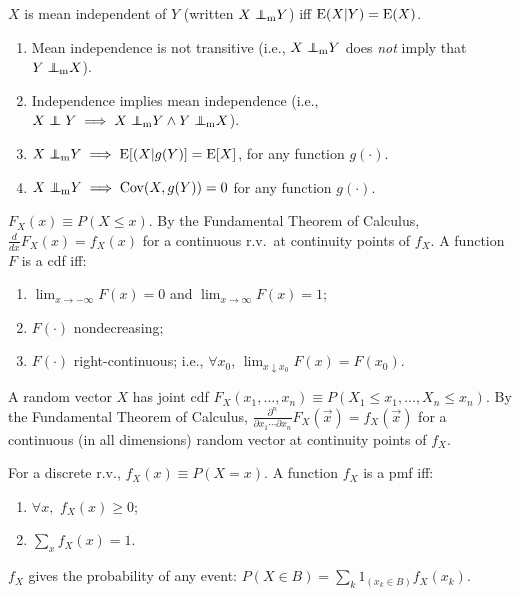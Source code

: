 \documentclass[8pt,letterpaper, landscape]{extarticle} %
\begin{document}
\begin{multicols}{3}
\begin{description}
 $ X $ is mean independent of $ Y $ (written $ X \independentm Y $) iff $ \operatorname{E} (X|Y) = \operatorname{E} (X) $.
\begin{enumerate}
\item Mean independence is not transitive (i.e., $ X \independentm Y $ does \textit{not} imply that $ Y \independentm X $).
\item Independence implies mean independence (i.e., $ X \independent Y \implies X \independentm Y \land Y \independentm X  $).
\item $ X \independentm Y \implies \E [(X | g(Y)] = \E [X] $, for any function $ g (\cdot) $.
\item $ X \independentm Y \implies \Cov (X, g(Y)) = 0 $ for any function $ g (\cdot) $.
\end{enumerate}

 $ F_X(x) \equiv P(X \leq x) $. By the Fundamental Theorem of Calculus, $ \frac{d}{dx} F_X(x) = f_X(x) $ for a continuous r.v.\ at continuity points of $ f_X $. A function $ F $ is a cdf iff:
\begin{enumerate}
\item $ \lim_{x \to -\infty} F(x) = 0 $ and $ \lim_{x \to \infty} F(x) = 1 $;
\item $ F (\cdot) $ nondecreasing;
\item $ F (\cdot) $ right-continuous; i.e., $ \forall x_0 $, $ \lim_{x \downarrow x_0} F(x) = F(x_0) $.
\end{enumerate}
A random vector $ X $ has joint cdf $ F_X(x_1, \dotsc, x_n) \equiv P (X_1 \leq x_1, \dotsc, X_n \leq x_n) $. By the Fundamental Theorem of Calculus, $ \frac{\partial^n}{\partial x_1 \dotsm \partial x_n} F_X(\vec{x}) = f_X(\vec{x}) $ for a continuous (in all dimensions) random vector at continuity points of $ f_X $.

 For a discrete r.v., $ f_X (x) \equiv P (X = x) $. A function $ f_X $ is a pmf iff:
\begin{enumerate}
\item $ \forall x, $ $ f_X(x) \geq 0 $;
\item $ \sum_x f_X(x) = 1 $.
\end{enumerate}
$ f_X $ gives the probability of any event: $ P (X \in B) = \sum_k 1_{(x_k \in B)} f_X(x_k) $.


\end{description}
\end{multicols}
\end{document}
